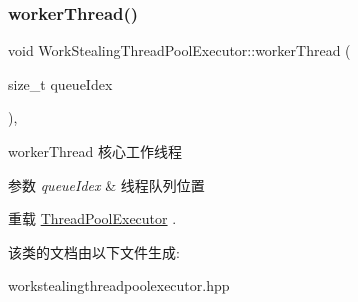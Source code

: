 \subsubsection{\texorpdfstring{worker\+Thread()}{workerThread()}}
{\footnotesize\ttfamily void Work\+Stealing\+Thread\+Pool\+Executor\+::worker\+Thread (\begin{DoxyParamCaption}\item[{size\+\_\+t}]{queue\+Idex }\end{DoxyParamCaption})\hspace{0.3cm}{\ttfamily [override]}, {\ttfamily [virtual]}}



worker\+Thread 核心工作线程 


\begin{DoxyParams}{参数}
{\em queue\+Idex} & 线程队列位置 \\
\hline
\end{DoxyParams}


重载 \hyperlink{classThreadPoolExecutor_a844902ce61fb16b11a569b8ee56e80e9}{Thread\+Pool\+Executor} .



该类的文档由以下文件生成\+:\begin{DoxyCompactItemize}
\item 
workstealingthreadpoolexecutor.\+hpp\end{DoxyCompactItemize}
